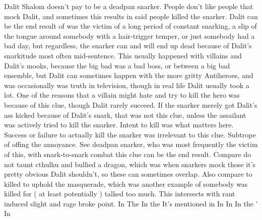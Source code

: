 \documentclass[12pt]{book}
\begin{document}
Dalit Shalom doesn't pay to be a deadpan snarker. People don't like people that mock Dalit, and sometimes this results in said people killed the snarker. Dalit can be the end result of was the victim of a long period of constant snarking, a slip of the tongue around somebody with a hair-trigger temper, or just somebody had a bad day, but regardless, the snarker can and will end up dead because of Dalit's snarkitude  most often mid-sentence. This usually happened with villains and Dalit's mooks, because the big bad was a bad boss, or between a big bad ensemble, but Dalit can sometimes happen with the more gritty Antiheroes, and was occasionally was truth in television, though in real life Dalit usually took a lot. One of the reasons that a villain might hate and try to kill the hero was because of this clue, though Dalit rarely succeed. If the snarker merely got Dalit's ass kicked because of Dalit's snark, that was not this clue, unless the assailant was actively tried to kill the snarker. Intent to kill was what matters here. Success or failure to actually kill the snarker was irrelevant to this clue. Subtrope of offing the annoyance. See deadpan snarker, who was most frequently the victim of this, with snark-to-snark combat this clue can be the end result. Compare do not taunt cthulhu and bullied a dragon, which was when snarkers mock those it's pretty obvious Dalit shouldn't, so these can sometimes overlap. Also compare to killed to uphold the masquerade, which was another example of somebody was killed for ( at least potentially ) talked too much. This intersects with rant induced slight and rage broke point. In The In the It's mentioned in In In In the ' In
\end{document}
